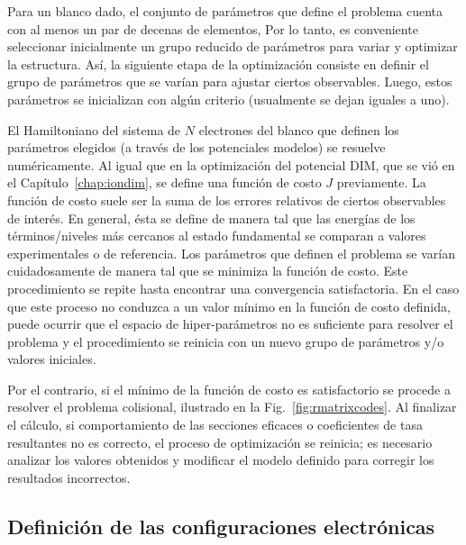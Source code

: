 Para un blanco dado, el conjunto de parámetros que define el problema
cuenta con al menos un par de decenas de elementos,  Por lo tanto, es 
conveniente seleccionar inicialmente un grupo reducido de parámetros 
para variar y optimizar la estructura. Así, la siguiente etapa de la
optimización consiste en definir el grupo de parámetros que se varían
para ajustar ciertos observables. Luego, estos parámetros se inicializan 
con algún criterio (usualmente se dejan iguales a uno). 

El Hamiltoniano del sistema de $N$ electrones del blanco que definen los
parámetros elegidos (a través de los potenciales modelos) se resuelve 
numéricamente. Al igual que en la optimización del potencial DIM, que se 
vió en el Capítulo~\ref{chap:iondim}, se define una función de costo $J$
previamente. La función de costo suele ser la suma de los errores 
relativos de ciertos observables de interés. En general, ésta se define 
de manera tal que las energías de los términos/niveles más cercanos al 
estado fundamental se comparan a valores experimentales o de referencia.
Los parámetros que definen el problema se varían cuidadosamente de 
manera tal que se minimiza la función de costo. Este procedimiento se 
repite hasta encontrar una convergencia satisfactoria. En el caso que 
este proceso no conduzca a un valor mínimo en la función de costo 
definida, puede ocurrir que el espacio de hiper-parámetros no es 
suficiente para resolver el problema y el procedimiento se reinicia con 
un nuevo grupo de parámetros y/o valores iniciales. 

Por el contrario, si el mínimo de la función de costo es satisfactorio 
se procede a resolver el problema colisional, ilustrado en la 
Fig.~\ref{fig:rmatrixcodes}. Al finalizar el cálculo, si comportamiento 
de las secciones eficaces o coeficientes de tasa resultantes no es 
correcto, el proceso de optimización se reinicia; es necesario analizar 
los valores obtenidos y modificar el modelo definido para corregir los 
resultados incorrectos. 

\subsection{Definición de las configuraciones electrónicas}

